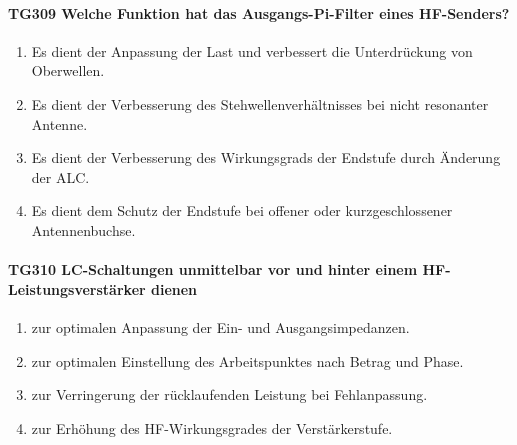 \documentclass[8pt]{article}
\begin{document}
\paragraph*{TG309 Welche Funktion hat das Ausgangs-Pi-Filter eines HF-Senders?}
\begin{enumerate}[nolistsep,label=\Alph*]
\item Es dient der Anpassung der Last und verbessert die Unterdrückung von Oberwellen.
\item Es dient der Verbesserung des Stehwellenverhältnisses bei nicht resonanter Antenne.
\item Es dient der Verbesserung des Wirkungsgrads der Endstufe durch Änderung der ALC.
\item Es dient dem Schutz der Endstufe bei offener oder kurzgeschlossener Antennenbuchse.
\end{enumerate}

\paragraph*{TG310 LC-Schaltungen unmittelbar vor und hinter einem HF-Leistungsverstärker dienen}
\begin{enumerate}[nolistsep,label=\Alph*]
\item zur optimalen Anpassung der Ein- und Ausgangsimpedanzen.
\item zur optimalen Einstellung des Arbeitspunktes nach Betrag und Phase.
\item zur Verringerung der rücklaufenden Leistung bei Fehlanpassung.
\item zur Erhöhung des HF-Wirkungsgrades der Verstärkerstufe.
\end{enumerate}
\end{document}
